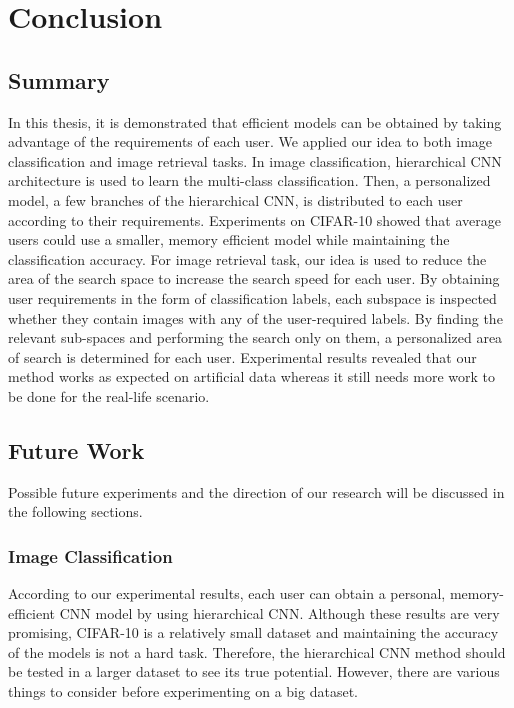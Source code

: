 
\lhead[\chaptername~\thechapter]{\rightmark}

\rhead[\leftmark]{}

\lfoot[\thepage]{}

\cfoot{}

\rfoot[]{\thepage}

\chapter{Conclusion}
\label{conclusion}

\section{Summary}

In this thesis, it is demonstrated that efficient models can be obtained by taking advantage of the requirements of each user. 
We applied our idea to both image classification and image retrieval tasks.
In image classification, hierarchical CNN architecture is used to learn the multi-class classification. 
Then, a personalized model, a few branches of the hierarchical CNN, is distributed to each user according to their requirements.
Experiments on CIFAR-10 showed that average users could use a smaller, memory efficient model while maintaining the classification accuracy.
For image retrieval task, our idea is used to reduce the area of the search space to increase the search speed for each user.
By obtaining user requirements in the form of classification labels, each subspace is inspected whether they contain images with any of the user-required labels. 
By finding the relevant sub-spaces and performing the search only on them, a personalized area of search is determined for each user. 
Experimental results revealed that our method works as expected on artificial data whereas it still needs more work to be done for the real-life scenario.

\section{Future Work}

Possible future experiments and the direction of our research will be discussed in the following sections.

\subsection*{Image Classification}

According to our experimental results, each user can obtain a personal, memory-efficient CNN model by using hierarchical CNN.
Although these results are very promising, CIFAR-10 is a relatively small dataset and maintaining the accuracy of the models is not a hard task.
Therefore, the hierarchical CNN method should be tested in a larger dataset to see its true potential. 
However, there are various things to consider before experimenting on a big dataset.

